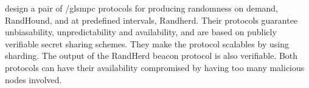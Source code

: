 \item[Scalable Bias-Resistant Distributed Randomness]
\citet{syta2017scalable} design a pair of /gls{mpc} protocols for producing randomness on demand, RandHound,  and at predefined intervals, Randherd. Their protocols guarantee unbiasability, unpredictability and availability, and are based on publicly verifiable secret sharing schemes.  They make the protocol scalables by using sharding. The output of the RandHerd beacon protocol is also verifiable. Both protocols can have their availability compromised by having too many malicious nodes involved.  